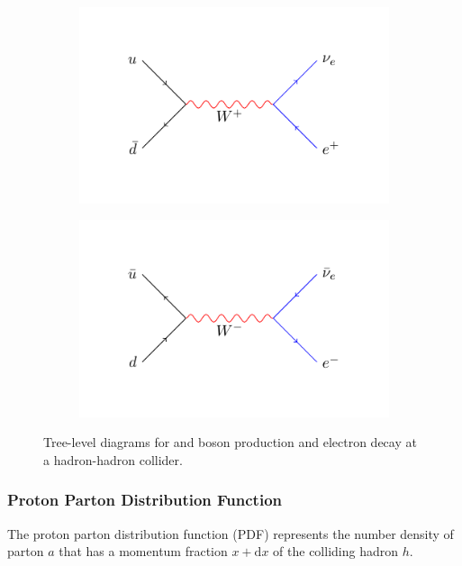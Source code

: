 \begin{figure}[htbp]
  \centering
  \begin{subfigure}{0.45\textwidth}
    \centering
    \includegraphics[width=\textwidth]{w_process_wp}
    \caption{\HepProcess{\Pup + \APdown \to \PWp \to \Pleptonplus \Pnulepton}}
    \label{fig:w_process_wp}
  \end{subfigure}
  \begin{subfigure}{0.45\textwidth}
    \centering
    \includegraphics[width=\textwidth]{w_process_wm}
    \caption{\HepProcess{\APup + \Pdown \to \PWm \to \Pleptonminus \APnulepton}}
    \label{fig:w_process_wm}
  \end{subfigure}
  \caption{Tree-level diagrams for \PWp and \PWm boson production and electron
decay at a hadron-hadron collider.}\label{fig:w_process} 
\end{figure}

\subsubsection*{Proton Parton Distribution Function} 
The proton parton distribution function (PDF) represents the number density of
parton $a$ that has a momentum fraction $x+\mathrm{d}x$ of the colliding hadron
$h$.  

